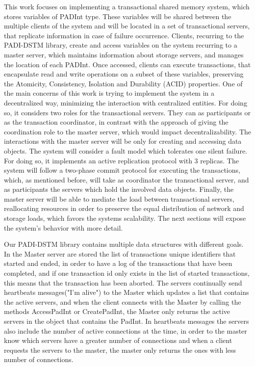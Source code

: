 \documentclass[times, 10pt,twocolumn]{article}
\begin{document}
This work focuses on implementing a transactional shared memory system, which stores variables of PADInt type. These variables will be shared between the multiple clients of the system and will be located in a set of transactional servers, that replicate information in case of failure occurrence. Clients, recurring to the PADI-DSTM library, create and access variables on the system recurring to a master server, which maintains information about storage servers, and manages the location of each PADInt. Once accessed, clients can execute transactions, that encapsulate read and write operations on a subset of these variables, preserving the Atomicity, Consistency, Isolation and Durability (ACID) properties. One of the main concerns of this work is trying to implement the system in a decentralized way, minimizing the interaction with centralized entities. For doing so, it considers two roles for the transactional servers. They can as participants or as the transaction coordinator, in contrast with the approach of giving the coordination role to the master server, which would impact decentralizability. The interactions with the master server will be only for creating and accessing data objects. The system will consider a fault model which tolerates one silent failure. For doing so, it implements an active replication protocol with 3 replicas. The system will follow a two-phase commit protocol for executing the transactions, which, as mentioned before, will take as coordinator the transactional server, and as participants the servers which hold the involved data objects. Finally, the master server will be able to mediate the load between transactional servers, reallocating resources in order to preserve the equal distribution of network and storage loads, which favors the systems scalability. The next sections will expose the system's behavior with more detail.




Our PADI-DSTM library contains multiple data structures with different goals. In the Master server are stored the list of transactions unique identifiers that started and ended, in order to have a log of the transactions that have been completed, and if one transaction id only exists in the list of started transactions, this means that the transaction has been aborted. The servers continually send  heartbeats messages("I'm alive") to the Master which updates a list that contains the active servers, and when the client connects with the Master by calling the methods AccessPadInt or CreatePadInt, the Master only returns the active servers in the object that contains the PadInt. In heartbeats messages the servers also include the number of active connections at the time, in order to the master know which servers have a greater number of connections and when a client requests the servers to the master, the master only returns the ones with less number of connections.  
\end{document}
